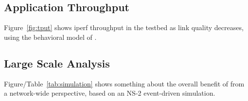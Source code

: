 \subsection{Application Throughput}
Figure~\ref{fig:tput} shows iperf throughput in the testbed as link quality
decreases, using the behavioral model of \OurSys. 

\subsection{Large Scale Analysis}
Figure/Table~\ref{tab:simulation} shows something about the overall benefit of \OurSys from a network-wide perspective, based on an NS-2 event-driven simulation.




